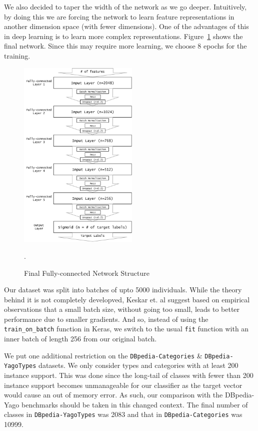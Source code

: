 \documentclass[runningheads,a4paper]{IEEEtran}
\begin{document}
We also decided to taper the width of the network as we go deeper. Intuitively, by doing this we are forcing the network to learn feature representations in another dimension space (with fewer dimensions). One of the advantages of this in deep learning is to learn more complex representations.  Figure~\ref{final} shows the final network. Since this may require more learning, we choose 8 epochs for the training. 

\begin{figure}[h]
\centering
\includegraphics[width=2.25in]{figures/final.pdf}
\caption{Final Fully-connected Network Structure}
\label{final}.
\end{figure}

Our dataset was split into batches of upto 5000 individuals. While the theory behind it is not completely developved, Keskar et. al \cite{keskar2016large} suggest based on empirical observations that a small batch size, without going too small, leads to better performance due to smaller gradients. And so, instead of using the \texttt{train\_on\_batch} function in Keras, we switch to the usual \texttt{fit} function with an inner batch of length 256 from our original batch. 

We put one additional restriction on the \texttt{DBpedia-Categories} \& \texttt{DBpedia-YagoTypes} datasets. We only consider types and categories with at least 200 instance support. This was done since the long-tail of classes with fewer than 200 instance support becomes unmanageable for our classifier as the target vector would cause an out of memory error. As such, our comparison with the DBpedia-Yago benchmarks should be taken in this changed context. The final number of classes in \texttt{DBpedia-YagoTypes} was 2083 and that in \texttt{DBpedia-Categories} was 10999.
\end{document}
